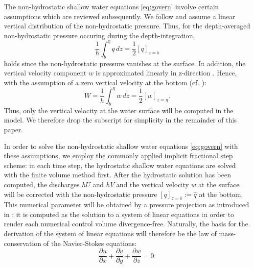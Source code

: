 The non-hydrostatic shallow water equations \eqref{eq:govern} involve certain assumptions which are reviewed subsequently. We follow \cite{walters} and assume a linear vertical distribution of the non-hydrostatic pressure. Thus, for the depth-averaged non-hydrostatic pressure occuring during the depth-integration,
\begin{equation}
\frac{1}{h} \int_{b}^{\eta} q \, dz= \frac{1}{2} [q]_{z=b}
\end{equation}
holds since the non-hydrostatic pressure vanishes at the surface. In addition, the vertical velocity component $w$ is approximated linearly in z-direction \cite{walters}. Hence, with the assumption of a zero vertical velocity at the bottom (cf. \cite{cui}):
\begin{equation}
W=  \frac{1}{h} \int_{b}^{\eta} w \, dz= \frac{1}{2} [w]_{z=\eta}.
\end{equation}
Thus, only the vertical velocity at the water surface will be computed in the model. We therefore drop the subscript for simplicity in the remainder of this paper.

In order to solve the non-hydrostatic shallow water equations \eqref{eq:govern} with these assumptions, we employ the commonly applied implicit fractional step scheme: in each time step, the hydrostatic shallow water equations are solved with the finite volume method first. After the hydrostatic solution has been computed, the discharges $hU$ and $hV$ and the vertical velocity $w$ at the surface will be corrected with the non-hydrostatic pressure $[q]_{z=b}:=\hat q$ at the bottom. This numerical parameter will be obtained by a pressure projection as introduced in \cite{chorin}: it is computed as the solution to a system of linear equations in order to render each numerical control volume divergence-free. Naturally, the basis for the derivation of the system of linear equations will therefore be the law of mass-conservation of the Navier-Stokes equations:
\begin{equation}
\frac{\partial u}{\partial x}
+
\frac{\partial v}{\partial y}
+
\frac{\partial w}{\partial z}
=
0.
\label{eq:mass_consv}
\end{equation}

